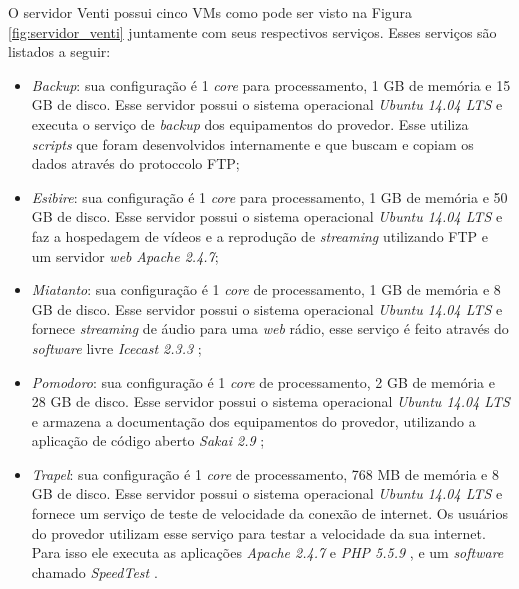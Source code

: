 O servidor Venti possui cinco \ac{VM}s como pode ser visto na Figura \ref{fig:servidor_venti} juntamente com seus respectivos serviços. 
Esses serviços são listados a seguir:
\begin{itemize}
 \item \textit{Backup}: sua configuração é 1 \textit{core} para processamento, 1 GB de memória e 15 GB de disco. Esse servidor possui o 
 sistema operacional \textit{Ubuntu 14.04 \ac{LTS}} \cite{ubuntu} e executa o serviço de \textit{backup} dos equipamentos do provedor. Esse
 utiliza \textit{scripts} que foram desenvolvidos internamente e que buscam e copiam os dados através do protoccolo \ac{FTP};
 
 \item \textit{Esibire}: sua configuração é 1 \textit{core} para processamento, 1 GB de memória e 50 GB de disco. Esse servidor possui o 
 sistema operacional \textit{Ubuntu 14.04 \ac{LTS}} \cite{ubuntu} e faz a hospedagem de vídeos e a reprodução de \textit{streaming} utilizando
 \ac{FTP} e um servidor \textit{web} \textit{Apache 2.4.7};
 
 \item \textit{Miatanto}: sua configuração é 1 \textit{core} de processamento, 1 GB de memória e 8 GB de disco. Esse servidor possui o 
 sistema operacional \textit{Ubuntu 14.04 \ac{LTS}} \cite{ubuntu} e fornece \textit{streaming} de áudio para uma \textit{web} rádio, esse serviço 
 é feito através do \textit{software} livre \textit{Icecast 2.3.3} \cite{icecast};
 
 \item \textit{Pomodoro}: sua configuração é 1 \textit{core} de processamento, 2 GB de memória e 28 GB de disco. Esse servidor possui o 
 sistema operacional \textit{Ubuntu 14.04 \ac{LTS}} \cite{ubuntu} e armazena a documentação dos equipamentos do provedor, utilizando a aplicação
 de código aberto \textit{Sakai 2.9} \cite{sakai};
 
 \item \textit{Trapel}: sua configuração é 1 \textit{core} de processamento, 768 MB de memória e 8 GB de disco. Esse servidor possui o sistema 
 operacional \textit{Ubuntu 14.04 \ac{LTS}} \cite{ubuntu} e fornece um serviço de teste de velocidade da conexão de internet. Os usuários do 
 provedor utilizam esse serviço para testar a velocidade da sua internet. Para isso ele executa as aplicações \textit{Apache 2.4.7} \cite{apache} 
 e \textit{\ac{PHP} 5.5.9} \cite{php}, e um \textit{software} chamado \textit{SpeedTest} \cite{speedtest}.
\end{itemize}

